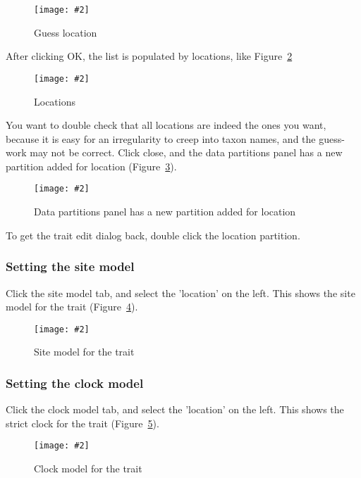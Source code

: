 \documentclass{article}
\newcommand{\includeimage}[2][]{%
\texttt{[image: \#2]}
}
\begin{document}
\begin{figure}
\centering	
\includeimage[scale=0.3]{figures/BEAUti_trait3}
\caption{Guess location}
\label{fig.BEAUti_trait3}
\end{figure}

After clicking OK, the list is populated by locations, like Figure~\ref{fig.BEAUti_trait4}

\begin{figure}
\centering	
\includeimage[scale=0.3]{figures/BEAUti_trait4}
\caption{Locations}
\label{fig.BEAUti_trait4}
\end{figure}

You want to double check that all locations are indeed the ones you want, because it is easy for an irregularity to creep into taxon names, and the guess-work may not be correct.
Click close, and the data partitions panel has a new partition added for location (Figure~\ref{fig.BEAUti_DataPartitions2}).

\begin{figure}
\centering	
\includeimage[scale=0.3]{figures/BEAUti_DataPartitions2}
\caption{Data partitions panel has a new partition added for location}
\label{fig.BEAUti_DataPartitions2}
\end{figure}

To get the trait edit dialog back, double click the location partition.

\subsubsection*{Setting the site model}

Click the site model tab, and select the 'location' on the left.
This shows the site model for the trait (Figure~\ref{fig.BEAUti_sitemodel2}).

\begin{figure}
\centering	
\includeimage[scale=0.3,clip=true,trim=0 400 0 0]{figures/BEAUti_sitemodel2}
\caption{Site model for the trait}
\label{fig.BEAUti_sitemodel2}
\end{figure}


\subsubsection*{Setting the clock model}

Click the clock model tab, and select the 'location' on the left.
This shows the strict clock for the trait (Figure~\ref{fig.BEAUti_clockmodel2}).

\begin{figure}
\centering	
\includeimage[scale=0.3,clip=true,trim=0 400 0 0]{figures/BEAUti_clockmodel2}
\caption{Clock model for the trait}
\label{fig.BEAUti_clockmodel2}
\end{figure}
\end{document}
